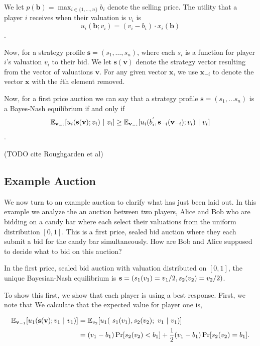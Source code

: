 \documentclass[12pt,twoside]{reedthesis}
\begin{document}
We let $p(\textbf{b}) = \max_{i \in \{1, \ldots, n\} } b_i$ denote the selling price. The utility that a player $i$ receives when their valuation is $v_i$ is 
$$u_i(\textbf{b}; v_i) = (v_i - b_i) \cdot x_i(\textbf{b})$$. 

Now, for a strategy profile $\textbf{s} = (s_1, \ldots, s_n)$, where each $s_i$ is a function for player $i$'s valuation $v_i$ to their bid. We let $\textbf{s}(\textbf{v})$ denote the strategy vector resulting from the vector of valuations $\textbf{v}$. For any given vector $\textbf{x}$, we use $\textbf{x}_{-i}$ to denote the vector $\textbf{x}$ with the $i$th element removed. 

Now, for a first price auction we can say that a strategy profile $\textbf{s} = (s_1, \ldots s_n)$ is a Bayes-Nash equilibrium if and only if 
$$ \mathbb{E}_{\textbf{v}_{-i}} [u_i(\textbf{s} (\textbf{v}); v_i) \ | \ v_i] \geq \mathbb{E}_{\textbf{v}_{-i}} [u_i(b^{'}_i, \textbf{s}_{-i}(\textbf{v}_{-i}); v_i) \ | \ v_i] $$.

(TODO cite Roughgarden et al)

\subsection{Example Auction}
We now turn to an example auction to clarify what has just been laid out. In this example we analyze the an auction between two players, Alice and Bob who are bidding on a candy bar where each select their valuations from the uniform distribution $[0,1]$. This is a first price, sealed bid auction where they each submit a bid for the candy bar simultaneously. How are Bob and Alice supposed to decide what to bid on this auction? 

\begin{prop}
	In the first price, sealed bid auction with valuation distributed on $[0,1]$, the unique Bayesian-Nash equilibrium is $\textbf{s} = (s_1(v_1) = v_1 / 2, s_2(v_2) = v_2 / 2)$.
\end{prop}

To show this first, we show that each player is using a best response. First, we note that We calculate that the expected value for player one is,

\begin{align*}
	\EXP_{\valuations_{-1}} [u_1(\strategies(\valuations); v_1 \ | \ v_1)] &= \EXP_{v_2}[u_1( \ s_1(v_1), s_2(v_2); \ v_1 \ | \ v_1)] \\
	&= (v_1 - b_1) \Pr[s_2(v_2) < b_1] + \frac{1}{2}(v_1 - b_1)\Pr[s_2(v_2) = b_1].
\end{align*}
\end{document}

